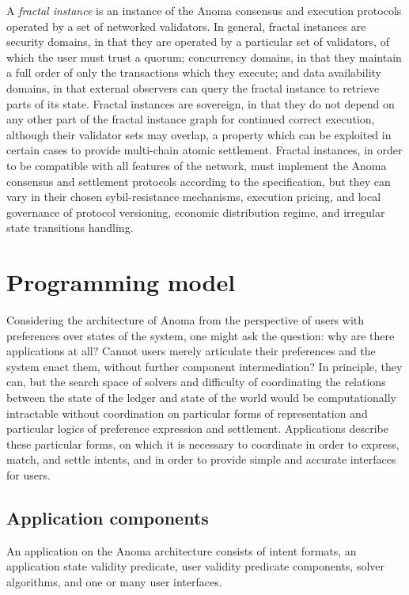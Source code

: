\documentclass[
    9pt,            %
    commun,        %
    affiltop,       %
]{art}
\begin{document}
A \emph{fractal instance} is an instance of the Anoma consensus and
execution protocols operated by a set of networked validators. In
general, fractal instances are security domains, in that they are
operated by a particular set of validators, of which the user must trust
a quorum; concurrency domains, in that they maintain a full order of
only the transactions which they execute; and data availability domains,
in that external observers can query the fractal instance to retrieve
parts of its state. Fractal instances are sovereign, in that they do not
depend on any other part of the fractal instance graph for continued
correct execution, although their validator sets may overlap, a property
which can be exploited in certain cases to provide multi-chain atomic
settlement. Fractal instances, in order to be compatible with all
features of the network, must implement the Anoma consensus and
settlement protocols according to the specification, but they can vary
in their chosen sybil-resistance mechanisms, execution pricing, and
local governance of protocol versioning, economic distribution regime,
and irregular state transitions handling.

\section{Programming model}\label{programming-model}

Considering the architecture of Anoma from the perspective of users with
preferences over states of the system, one might ask the question: why
are there applications at all? Cannot users merely articulate their
preferences and the system enact them, without further component
intermediation? In principle, they can, but the search space of solvers
and difficulty of coordinating the relations between the state of the
ledger and state of the world would be computationally intractable
without coordination on particular forms of representation and
particular logics of preference expression and settlement. Applications
describe these particular forms, on which it is necessary to coordinate
in order to express, match, and settle intents, and in order to provide
simple and accurate interfaces for users.

\subsection{Application components}\label{application-components}

An application on the Anoma architecture consists of intent formats, an
application state validity predicate, user validity predicate
components, solver algorithms, and one or many user interfaces.
\end{document}
